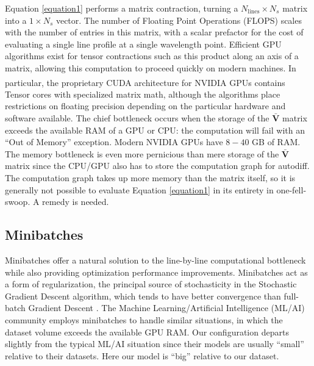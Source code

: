 \documentclass[modern]{aastex631}
\begin{document}
Equation \ref{equation1} performs a matrix contraction, turning a $N_{\mathrm{lines}}\times N_{s}$ matrix into a $1\times N_{s}$ vector. The number of Floating Point Operations (FLOPS) scales with the number of entries in this matrix, with a scalar prefactor for the cost of evaluating a single line profile at a single wavelength point. Efficient GPU algorithms exist for tensor contractions such as this product along an axis of a matrix, allowing this computation to proceed quickly on modern machines. In particular, the proprietary CUDA architecture for NVIDIA\textsuperscript{\tiny\textregistered} GPUs contains Tensor cores with specialized matrix math, although the algorithms place restrictions on floating precision depending on the particular hardware and software available. The chief bottleneck occurs when the storage of the $\bm{\bar{V}}$ matrix exceeds the available RAM of a GPU or CPU: the computation will fail with an ``Out of Memory'' exception. Modern NVIDIA GPUs have $8-40$ GB of RAM. The memory bottleneck is even more pernicious than mere storage of the $\bm{\bar{V}}$ matrix since the CPU/GPU also has to store the computation graph for autodiff. The computation graph takes up more memory than the matrix itself, so it is generally not possible to evaluate Equation \ref{equation1} in its entirety in one-fell-swoop. A remedy is needed.

\subsection{Minibatches}

Minibatches offer a natural solution to the line-by-line computational bottleneck while also providing optimization performance improvements. Minibatches act as a form of regularization, the principal source of stochasticity in the Stochastic Gradient Descent algorithm, which tends to have better convergence than full-batch Gradient Descent \citep{2016arXiv160904747R}. The Machine Learning/Artificial Intelligence (ML/AI) community employs minibatches to handle similar situations, in which the dataset volume exceeds the available GPU RAM. Our configuration departs slightly from the typical ML/AI situation since their models are usually ``small'' relative to their datasets. Here our model is ``big'' relative to our dataset.
\end{document}
